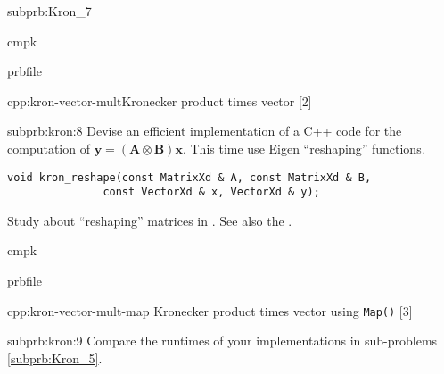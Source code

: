\begin{samproblem}
\begin{subproblem}{subprb:Kron_7}
\begin{samwriteprbpart}{cmpk}
  \begin{writeverbatim}{prbfile}
    \begin{samsolution}
      \begin{samcode}[C++11-code]{cpp:kron-vector-mult}{Kronecker product times vector}
        [2]
      \end{samcode}
    \end{samsolution}
  \end{writeverbatim}
\end{samwriteprbpart}
\end{subproblem}

\begin{subproblem}{subprb:kron:8}
  Devise an efficient implementation of a C++ code for the computation of
  $\mathbf{y} = (\mathbf{A} \otimes \mathbf{B}) \mathbf{x}$. This time use
  Eigen ``reshaping'' functions.
  \begin{lstlisting}[style=cppsimple]
void kron_reshape(const MatrixXd & A, const MatrixXd & B,
               const VectorXd & x, VectorXd & y);
  \end{lstlisting}
  Study  about ``reshaping'' matrices in \eigen{}. See also the
  .

\begin{samwriteprbpart}{cmpk}
  \begin{writeverbatim}{prbfile}
    \begin{samsolution}
      \begin{samcode}[C++11-code]{cpp:kron-vector-mult-map}
        {Kronecker product times vector using \texttt{Map()}}
        [3]
      \end{samcode}
    \end{samsolution}
  \end{writeverbatim}
\end{samwriteprbpart}
\end{subproblem}

\begin{subproblem}{subprb:kron:9}
  Compare the runtimes of your implementations in sub-problems \ref{subprb:Kron_5}.


\end{subproblem}
\end{samproblem}
